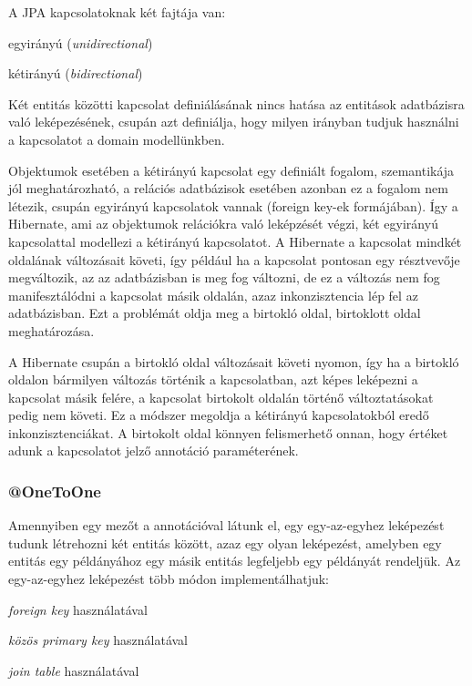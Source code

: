 A JPA kapcsolatoknak két fajtája van:
\begin{listing}
	\item egyirányú (\emph{unidirectional})
	\item kétirányú (\emph{bidirectional})
\end{listing}

Két entitás közötti kapcsolat definiálásának nincs hatása az entitások adatbázisra való leképezésének, csupán azt definiálja, hogy milyen irányban tudjuk használni a kapcsolatot a domain modellünkben. \par

Objektumok esetében a kétirányú kapcsolat egy definiált fogalom, szemantikája jól meghatározható, a relációs adatbázisok esetében azonban ez a fogalom nem létezik, csupán egyirányú kapcsolatok vannak (foreign key-ek formájában). Így a Hibernate, ami az objektumok relációkra való leképzését végzi, két egyirányú kapcsolattal modellezi a kétirányú kapcsolatot. A Hibernate a kapcsolat mindkét oldalának változásait követi, így például ha a kapcsolat pontosan egy résztvevője megváltozik, az az adatbázisban is meg fog változni, de ez a változás nem fog manifesztálódni a kapcsolat másik oldalán, azaz inkonzisztencia lép fel az adatbázisban. Ezt a problémát oldja meg a birtokló oldal, birtoklott oldal meghatározása. \par

A Hibernate csupán a birtokló oldal változásait követi nyomon, így ha a birtokló oldalon bármilyen változás történik a kapcsolatban, azt képes leképezni a kapcsolat másik felére, a kapcsolat birtokolt oldalán történő változtatásokat pedig nem követi. Ez a módszer megoldja a kétirányú kapcsolatokból eredő inkonzisztenciákat. A birtokolt oldal könnyen felismerhető onnan, hogy értéket adunk a kapcsolatot jelző annotáció  paraméterének. \par

\subsubsection{@OneToOne}

Amennyiben egy mezőt a  annotációval látunk el, egy egy-az-egyhez leképezést tudunk létrehozni két entitás között, azaz egy olyan leképezést, amelyben egy entitás egy példányához egy másik entitás legfeljebb egy példányát rendeljük. Az egy-az-egyhez leképezést több módon implementálhatjuk:

\begin{listing}
	\item \emph{foreign key} használatával
	\item \emph{közös primary key} használatával
	\item \emph{join table} használatával
\end{listing}

